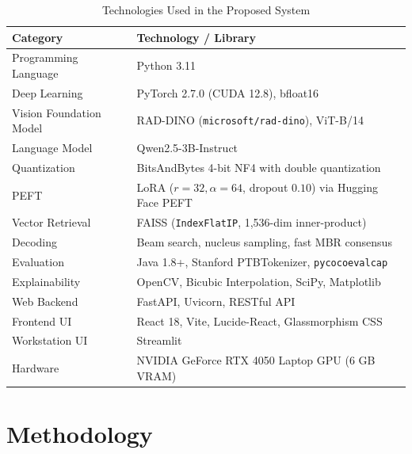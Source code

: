 \documentclass[12pt,a4paper]{report}
\begin{document}
\begin{table}[htbp]
\centering
\caption{Technologies Used in the Proposed System}
\label{tab:tech_stack}
\begin{tabularx}{\textwidth}{p{3.5cm}X}
\toprule
\textbf{Category} & \textbf{Technology / Library} \\
\midrule
Programming Language & Python 3.11 \\
Deep Learning & PyTorch 2.7.0 (CUDA 12.8), bfloat16 \\
Vision Foundation Model & RAD-DINO (\texttt{microsoft/rad-dino}), ViT-B/14 \\
Language Model & Qwen2.5-3B-Instruct \\
Quantization & BitsAndBytes 4-bit NF4 with double quantization \\
PEFT & LoRA ($r=32, \alpha=64$, dropout $0.10$) via Hugging Face PEFT \\
Vector Retrieval & FAISS (\texttt{IndexFlatIP}, 1,536-dim inner-product) \\
Decoding & Beam search, nucleus sampling, fast MBR consensus \\
Evaluation & Java 1.8+, Stanford PTBTokenizer, \texttt{pycocoevalcap} \\
Explainability & OpenCV, Bicubic Interpolation, SciPy, Matplotlib \\
Web Backend & FastAPI, Uvicorn, RESTful API \\
Frontend UI & React 18, Vite, Lucide-React, Glassmorphism CSS \\
Workstation UI & Streamlit \\
Hardware & NVIDIA GeForce RTX 4050 Laptop GPU (6 GB VRAM) \\
\bottomrule
\end{tabularx}
\end{table}

\chapter{Methodology}
\end{document}
